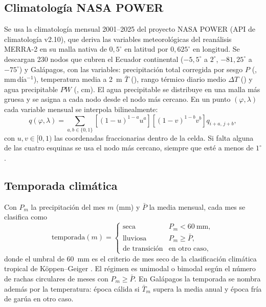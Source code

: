 \documentclass[11pt,a4paper]{article}
\newcommand{\codigo}[1]{\cpcodigo{#1}}
\begin{document}
\subsection{Climatología NASA POWER}
Se usa la climatología mensual 2001--2025 del proyecto NASA POWER \cite{power2025} (API de climatología
v2.10), que deriva las variables meteorológicas del reanálisis MERRA-2 \cite{gelaro2017} en su malla
nativa de $0{,}5^\circ$ en latitud por $0{,}625^\circ$ en longitud. Se descargan 230 nodos que cubren el
Ecuador continental ($-5{,}5^\circ$ a $2^\circ$, $-81{,}25^\circ$ a $-75^\circ$) y Galápagos, con las
variables: precipitación total corregida por sesgo $P$ (\codigo{PRECTOTCORR}, mm\,día$^{-1}$), temperatura
media a 2~m $\bar T$ (\codigo{T2M}), rango térmico diario medio $\Delta T$ (\codigo{T2M\_RANGE}) y agua
precipitable $PW$ (\codigo{PW}, cm). El agua precipitable se distribuye en una malla más gruesa y se
asigna a cada nodo desde el nodo más cercano. En un punto $(\varphi,\lambda)$ cada variable mensual se
interpola bilinealmente:
\begin{equation}
  q(\varphi,\lambda) = \sum_{a,b\in\{0,1\}} \left[(1-u)^{1-a}u^{a}\right]\left[(1-v)^{1-b}v^{b}\right] q_{i+a,\,j+b},
\end{equation}
con $u,v\in[0,1)$ las coordenadas fraccionarias dentro de la celda. Si falta alguna de las cuatro
esquinas se usa el nodo más cercano, siempre que esté a menos de $1^\circ$.

\subsection{Temporada climática}
Con $P_m$ la precipitación del mes $m$ (mm) y $\bar P$ la media mensual, cada mes se clasifica como
\begin{equation}
  \text{temporada}(m) = \begin{cases}
    \text{seca} & P_m < 60~\text{mm},\\
    \text{lluviosa} & P_m \ge \bar P,\\
    \text{de transición} & \text{en otro caso},
  \end{cases}
\end{equation}
donde el umbral de 60~mm es el criterio de mes seco de la clasificación climática tropical de
Köppen--Geiger \cite{peel2007}. El régimen es unimodal o bimodal según el número de rachas circulares
de meses con $P_m\ge\bar P$. En Galápagos la temporada se nombra además por la temperatura: época cálida
si $\bar T_m$ supera la media anual y época fría de garúa en otro caso.
\end{document}
